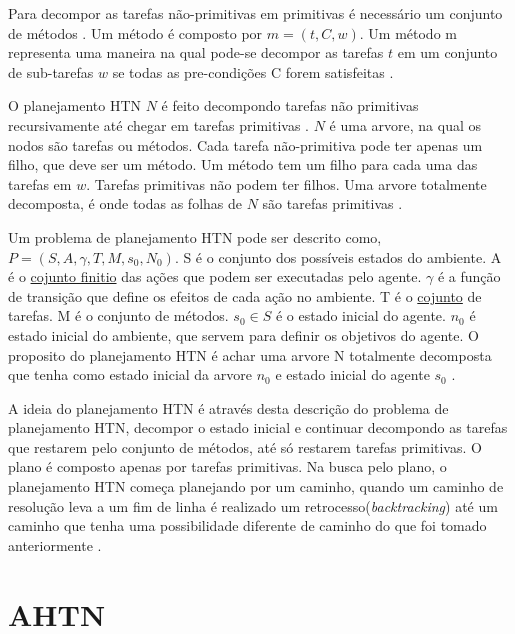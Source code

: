 Para decompor as tarefas não-primitivas em primitivas é necessário um conjunto de métodos \cite{ghallab2004automated}. 
Um método é composto por $m = (t, C, w)$. 
Um método m representa uma maneira na qual pode-se decompor as tarefas $t$ em um conjunto de sub-tarefas $w$ se todas as pre-condições C forem satisfeitas \cite{ontanon2015adversarial}.

O planejamento HTN $N$ é feito decompondo tarefas não primitivas recursivamente até chegar em tarefas primitivas \cite{ghallab2004automated}. $N$ é uma arvore, na qual os nodos são tarefas ou métodos. Cada tarefa não-primitiva pode ter apenas um filho, que deve ser um método. Um método tem um filho para cada uma das tarefas em $w$. Tarefas primitivas não podem ter filhos. Uma arvore totalmente decomposta, é onde todas as folhas de $N$ são tarefas primitivas \cite{ontanon2015adversarial}.

Um problema de planejamento HTN pode ser descrito como, $ P = (S, A, \gamma, T, M, s_{0}, N_{0}) $. S é o conjunto dos possíveis estados do ambiente. A é o \underline{cojunto finitio} das ações que podem ser executadas pelo agente. $\gamma$ é a função de transição que define os efeitos de cada ação no ambiente. T é o \underline{cojunto} de tarefas. M é o conjunto de métodos. $s_{0} \in S$ é o estado inicial do agente. $n_{0}$ é estado inicial do ambiente, que servem para definir os objetivos do agente. O proposito do planejamento HTN é achar uma arvore N totalmente decomposta que tenha como estado inicial da arvore $n_{0}$ e estado inicial do agente $s_{0}$ \cite{ontanon2015adversarial}.

A ideia do planejamento HTN é através desta descrição do problema de planejamento HTN, decompor o estado inicial e continuar decompondo as tarefas que restarem pelo conjunto de métodos, até só restarem tarefas primitivas. O plano é composto apenas por tarefas primitivas. Na busca pelo plano, o planejamento HTN começa planejando por um caminho, quando um caminho de resolução leva a um fim de linha é realizado um retrocesso(\textit{backtracking}) até um caminho que tenha uma possibilidade diferente de caminho do que foi tomado anteriormente \cite{intelligence2003modern}. 

\section{AHTN} 

